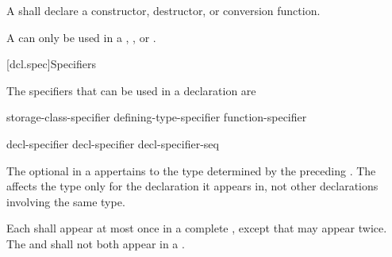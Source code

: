 \pnum
A  shall declare a
constructor, destructor, or conversion function.
\begin{note}
A  can only be used in a
,
, or
.
\end{note}

[dcl.spec]{Specifiers}%

\pnum
{}%
The specifiers that can be used in a declaration are

\begin{bnf}
\br
    storage-class-specifier\br
    defining-type-specifier\br
    function-specifier\br
    \br
    \br
    \br
    \br
\end{bnf}

\begin{bnf}
\br
    decl-specifier \br
    decl-specifier decl-specifier-seq
\end{bnf}

The optional  in a 
appertains to the type determined by the preceding
. The 
affects the type only for the declaration it appears in, not other declarations involving the
same type.

\pnum
Each 
shall appear at most once in a complete ,
except that  may appear twice.
The  and  
shall not both appear in a .

